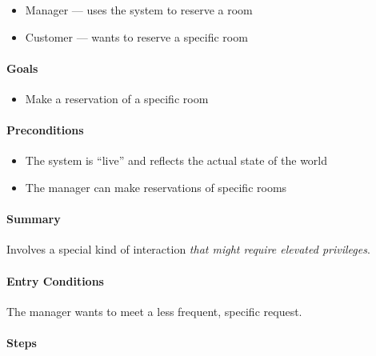 \begin{itemize}
\tightlist
\item
  Manager --- uses the system to reserve a room
\item
  Customer --- wants to reserve a specific room
\end{itemize}

\paragraph{Goals}

\begin{itemize}
\tightlist
\item
  Make a reservation of a specific room
\end{itemize}

\paragraph{Preconditions}

\begin{itemize}
\tightlist
\item
  The system is ``live'' and reflects the actual state of the world
\item
  The manager can make reservations of specific rooms
\end{itemize}

\paragraph{Summary}

Involves a special kind of interaction \emph{that might require elevated
privileges}.

\paragraph{Entry Conditions}

The manager wants to meet a less frequent, specific request.

\paragraph{Steps}

